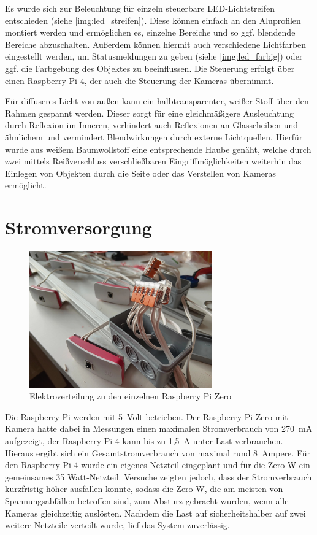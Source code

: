 \documentclass[./00PhotoBox.tex]{subfiles}
\begin{document}
Es wurde sich zur Beleuchtung für einzeln steuerbare LED-Lichtstreifen entschieden (siehe \autoref{img:led_streifen}). Diese können einfach an den Aluprofilen montiert werden und ermöglichen es, einzelne Bereiche und so ggf. blendende Bereiche abzuschalten. Außerdem können hiermit auch verschiedene Lichtfarben eingestellt werden, um Statusmeldungen zu geben (siehe \autoref{img:led_farbig}) oder ggf. die Farbgebung des Objektes zu beeinflussen. Die Steuerung erfolgt über einen Raspberry Pi 4, der auch die Steuerung der Kameras übernimmt.

Für diffuseres Licht von außen kann ein halbtransparenter, weißer Stoff über den Rahmen gespannt werden. Dieser sorgt für eine gleichmäßigere Ausleuchtung durch Reflexion im Inneren, verhindert auch Reflexionen an Glasscheiben und ähnlichem und vermindert Blendwirkungen durch externe Lichtquellen. Hierfür wurde aus weißem Baumwollstoff eine entsprechende Haube genäht, welche durch zwei mittels Reißverschluss verschließbaren Eingriffmöglichkeiten weiterhin das Einlegen von Objekten durch die Seite oder das Verstellen von Kameras ermöglicht.


\section{Stromversorgung}

\begin{figure}
    \centering
    \includegraphics[width=0.7\textwidth]{./img/stromverteilung.jpg}
    \caption{Elektroverteilung zu den einzelnen Raspberry Pi Zero} %
    \label{img:stromverteilung} %
\end{figure}

Die Raspberry Pi werden mit 5~Volt betrieben. Der Raspberry Pi Zero mit Kamera hatte dabei in Messungen einen maximalen Stromverbrauch von 270~mA aufgezeigt, der Raspberry Pi 4 kann bis zu 1,5~A unter Last verbrauchen. Hieraus ergibt sich ein Gesamtstromverbrauch von maximal rund 8~Ampere. Für den Raspberry Pi 4 wurde ein eigenes Netzteil eingeplant und für die Zero W ein gemeinsames 35 Watt-Netzteil. Versuche zeigten jedoch, dass der Stromverbrauch kurzfristig höher ausfallen konnte, sodass die Zero W, die am meisten von Spannungsabfällen betroffen sind, zum Absturz gebracht wurden, wenn alle Kameras gleichzeitig auslösten. Nachdem die Last auf sicherheitshalber auf zwei weitere Netzteile verteilt wurde, lief das System zuverlässig.
\end{document}
